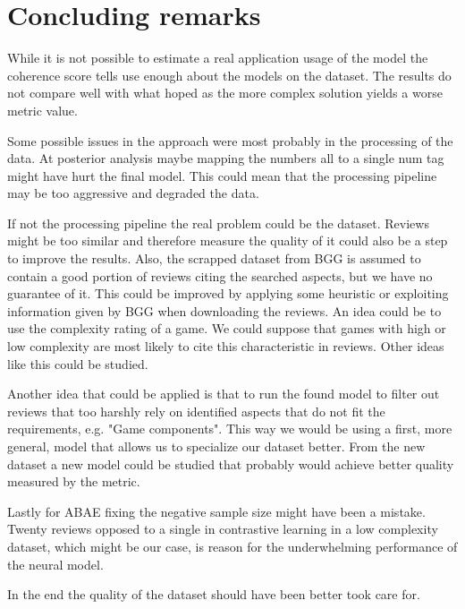 \section{Concluding remarks}

While it is not possible to estimate a real application usage of the model the
coherence score tells use enough about the models on the dataset.
The results do not compare well with what hoped as the more complex solution yields a worse metric value.

Some possible issues in the approach were most probably in the processing of the data.
At posterior analysis maybe mapping the numbers all to a single num tag might have hurt the final model.
This could mean that the processing pipeline may be too aggressive and degraded the data.

If not the processing pipeline the real problem could be the dataset.
Reviews might be too similar and therefore measure the quality of it could also be a step to improve the results.
Also, the scrapped dataset from BGG is assumed to contain a good portion of reviews citing the searched aspects,
but we have no guarantee of it.
This could be improved by applying some heuristic or exploiting information given by BGG when downloading the reviews.
An idea could be to use the complexity rating of a game.
We could suppose that games with high or low complexity are most likely to cite this characteristic in reviews.
Other ideas like this could be studied.


Another idea that could be applied is that to run the found model to filter out reviews that too harshly rely
on identified aspects that do not fit the requirements, e.g. "Game components".
This way we would be using a first, more general, model that allows us to specialize our dataset better.
From the new dataset a new model could be studied that probably would achieve better quality measured by the metric.

Lastly for ABAE fixing the negative sample size might have been a mistake.
Twenty reviews opposed to a single in contrastive learning in a low complexity dataset, which
might be our case, is reason for the underwhelming performance of the neural model.

In the end the quality of the dataset should have been better took care for.